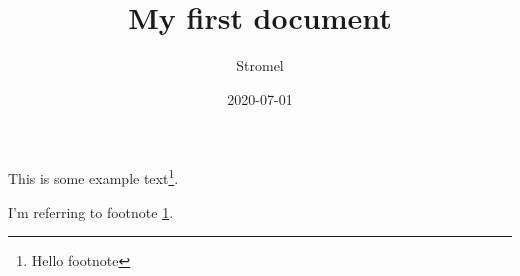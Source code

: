 \documentclass{article}
\title{My first document}
\date{2020-07-01}
\author{Stromel}
\begin{document}
	
	This is some example text\footnote{\label{myfootnote}Hello footnote}.
	
	I'm referring to footnote \ref{myfootnote}.
	
\end{document}
